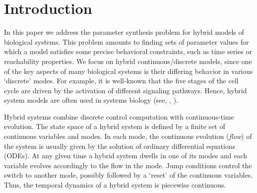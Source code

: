 \section{Introduction}


In this paper we address the parameter synthesis problem for hybrid models of biological systems.
This problem amounts to finding sets of parameter values for which a model satisfies some precise 
behavioral constraints, such as time series or reachability properties. We focus on hybrid 
continuous/discrete models, since one of the key aspects of many biological systems is their differing 
behavior in various `discrete' modes. For example, it is well-known that the five stages of the cell 
cycle are driven by the activation of different signaling pathways. Hence, hybrid system models are often 
used in systems biology (see, \eg, 
\citep{tomlin04,Hu04,ye08,aihara10,antoniotti03,lincoln04,baldazzi11}).

Hybrid systems combine discrete control computation with continuous-time evolution. The state space 
of a hybrid system is defined by a finite set of continuous variables and modes. In each mode, the
continuous evolution ({\em flow}) of the system is usually given by the solution of ordinary differential
equations (ODEs). At any given time a hybrid system dwells in one of its modes and each variable 
evolves accordingly to the flow in the mode. Jump conditions control the switch to another mode,
possibly followed by a `reset' of the continuous variables. Thus, the temporal dynamics of a 
hybrid system is piecewise continuous.

